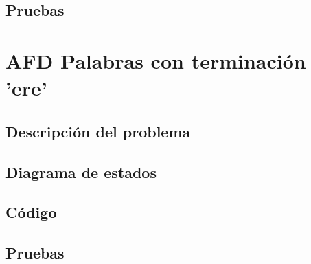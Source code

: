 \documentclass[12pt, titlepage]{article}
\begin{document}
	\subsection{Pruebas}
	\lipsum[1]
	
	\section{AFD Palabras con terminación 'ere'}
	\lipsum[1]
	\subsection{Descripción del problema}
	\lipsum[1]
	\subsection{Diagrama de estados}
	\lipsum[1]
	\subsection{Código}
	\lipsum[1]
	\subsection{Pruebas}
	\lipsum[1]
	
	 
	
\end{document}
